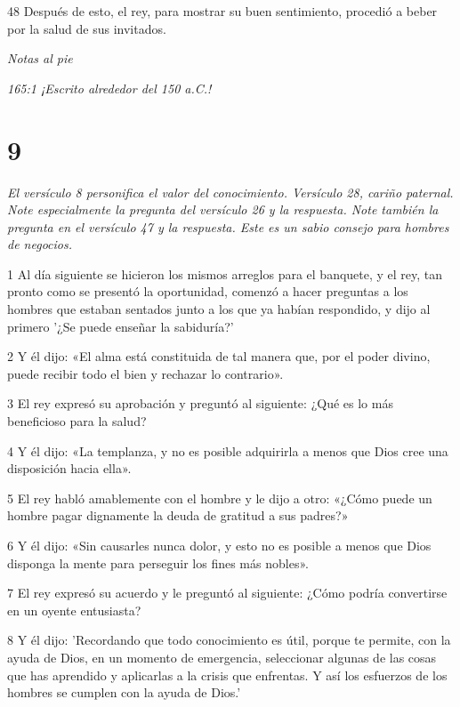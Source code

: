 \par 48 Después de esto, el rey, para mostrar su buen sentimiento, procedió a beber por la salud de sus invitados.

\par \textit{Notas al pie}

\par \textit{165:1 ¡Escrito alrededor del 150 a.C.!}

\chapter{9}

\par \textit{El versículo 8 personifica el valor del conocimiento. Versículo 28, cariño paternal. Note especialmente la pregunta del versículo 26 y la respuesta. Note también la pregunta en el versículo 47 y la respuesta. Este es un sabio consejo para hombres de negocios.}

\par 1 Al día siguiente se hicieron los mismos arreglos para el banquete, y el rey, tan pronto como se presentó la oportunidad, comenzó a hacer preguntas a los hombres que estaban sentados junto a los que ya habían respondido, y dijo al primero '¿Se puede enseñar la sabiduría?'

\par 2 Y él dijo: «El alma está constituida de tal manera que, por el poder divino, puede recibir todo el bien y rechazar lo contrario».

\par 3 El rey expresó su aprobación y preguntó al siguiente: ¿Qué es lo más beneficioso para la salud?

\par 4 Y él dijo: «La templanza, y no es posible adquirirla a menos que Dios cree una disposición hacia ella».

\par 5 El rey habló amablemente con el hombre y le dijo a otro: «¿Cómo puede un hombre pagar dignamente la deuda de gratitud a sus padres?»

\par 6 Y él dijo: «Sin causarles nunca dolor, y esto no es posible a menos que Dios disponga la mente para perseguir los fines más nobles».

\par 7 El rey expresó su acuerdo y le preguntó al siguiente: ¿Cómo podría convertirse en un oyente entusiasta?

\par 8 Y él dijo: 'Recordando que todo conocimiento es útil, porque te permite, con la ayuda de Dios, en un momento de emergencia, seleccionar algunas de las cosas que has aprendido y aplicarlas a la crisis que enfrentas. Y así los esfuerzos de los hombres se cumplen con la ayuda de Dios.'

